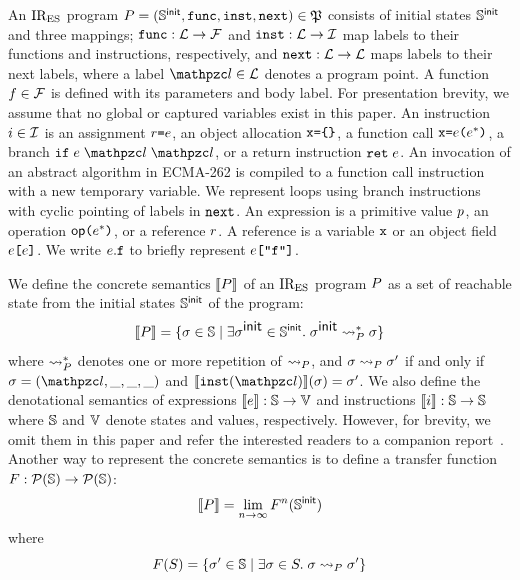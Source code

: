 An $\text{IR}_\text{ES}$ program $\prog = (\initstset, \getfunc,
\getinst, \getnext) \in \progset $ consists of initial states
$\mathbb{S}^{\textsf{init}}$ and three mappings; $\getfunc: \labset \rightarrow
\funcset$ and $\getinst: \labset \rightarrow \instset$ map labels to
their functions and instructions, respectively, and $\getnext: \labset
\rightarrow \labset$ maps labels to their next labels, where a label $\lab \in
\labset$ denotes a program point.  A function $f \in \mathcal{F}$ is defined
with its parameters and body label.  For presentation brevity, we assume that no
global or captured variables exist in this paper.  An instruction $i \in
\mathcal{I}$ is an assignment $\refer \kweq \expr$, an object allocation $\varx
\kweq \kwcl \kwcr$, a function call $\varx \kweq \expr \kwrl \expr^* \kwrr$, a
branch $\kwif \; \expr \; \lab \; \lab$, or a return instruction $\kwret \;
\expr$.  An invocation of an abstract algorithm in ECMA-262 is compiled to a
function call instruction with a new temporary variable.  We represent loops
using branch instructions with cyclic pointing of labels in $\getnext$.
An expression is a primitive value $p$, an operation $\op \kwrl \expr^*
\kwrr$, or a reference $r$.  A reference is a variable $\varx$ or an object
field $\expr \kwsl \expr \kwsr$.  We write $\expr.\varf$ to briefly represent
$\expr \kwsl \code{"f"} \kwsr$.

We define the concrete semantics $\llbracket{P}\rrbracket$ of an $\text{IR}_\text{ES}$ program $P$ as
a set of reachable state from the initial states $\mathbb{S}^{\textsf{init}}$ of the
program:
\[
  \sem{\prog} = \{ \st \in \stset \mid \exists \initst \in \initstset. \;
  \initst \trans{\prog}^* \st \}
\]
where $\leadsto_{P}^*$ denotes one or more repetition of $\leadsto_{P}$, and
$\sigma \leadsto_{P} \sigma'$ if and only if $\st = (\lab, \_, \_, \_)$ and
$\sem{\getinst(\lab)}(\st) = \st'$.  We also define the denotational
semantics of expressions $\llbracket{e}\rrbracket: \mathbb{S} \rightarrow \mathbb{V}$ and
instructions $\llbracket{i}\rrbracket: \mathbb{S} \rightarrow \mathbb{S}$ where $\mathbb{S}$ and
$\mathbb{V}$ denote states and values, respectively.  However, for
brevity, we omit them in this paper and refer the interested readers to a
companion report~\cite{report}.  Another way to represent the concrete semantics
is to define a transfer function $F: \mathcal{P}(\mathbb{S}) \rightarrow
\mathcal{P}(\mathbb{S})$:
\[
  \llbracket{P}\rrbracket = \lim_{n \rightarrow \infty}F^n(\mathbb{S}^{\textsf{init}})
\]
where
\begin{equation}\label{eqn:transfer}
  \transfer(S) = \{ \st' \in \stset \mid \exists \st \in S. \; \st \trans{\prog}
  \st' \}
\end{equation}

